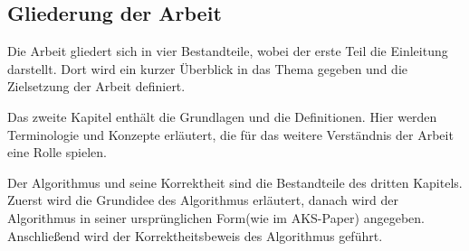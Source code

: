 \documentclass[12pt,oneside]{article}
\theoremstyle{remark}
\theoremstyle{definition}
\begin{document}
\subsection{Gliederung der Arbeit}
Die Arbeit gliedert sich in vier Bestandteile, wobei der
erste Teil die Einleitung darstellt. Dort wird ein kurzer Überblick in das Thema gegeben und die Zielsetzung der Arbeit definiert.

Das zweite Kapitel enthält die Grundlagen und die Definitionen. Hier werden Terminologie und Konzepte erläutert, die für das weitere Verständnis der Arbeit eine Rolle spielen. 

Der Algorithmus und seine Korrektheit sind die Bestandteile des dritten Kapitels. Zuerst wird die Grundidee des Algorithmus erläutert, danach wird der Algorithmus in seiner ursprünglichen Form(wie im AKS-Paper) angegeben. Anschließend wird der Korrektheitsbeweis des Algorithmus geführt.
\end{document}
